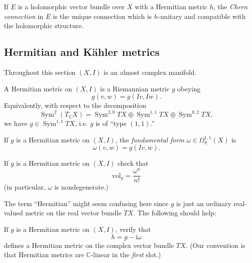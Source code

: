 \documentclass[12pt,letterpaper,reqno]{amsart}
\numberwithin{equation}{section}
\newcommand{\R}{\ensuremath{\mathbb R}}
\newcommand{\C}{\ensuremath{\mathbb C}}
\newcommand{\kahler}{K\"ahler\xspace}
\newcommand{\I}{{\mathrm i}}
\newcommand{\ti}[1]{\textit{#1}}
\DeclareMathOperator{\Sym}{Sym}
\begin{document}
\begin{defn}
If $E$ is a holomorphic vector bundle over $X$ with
a Hermitian metric $h$, the \ti{Chern connection} 
in $E$ is the unique connection which is 
$h$-unitary and compatible with the holomorphic
structure.
\end{defn}

\subsection{Hermitian and \kahler metrics}
Throughout this section $(X,I)$ is an almost complex manifold.

\begin{defn} A Hermitian metric on 
$(X,I)$ is a Riemannian metric $g$ obeying
$$ g(v,w) = g(Iv,Iw). $$
Equivalently, with respect to the decomposition 
\begin{equation}
  \Sym^2 (T_\C X) = \Sym^{2,0} TX \oplus \Sym^{1,1} TX \oplus \Sym^{0,2} TX,
\end{equation}
we have $g \in \Sym^{1,1} TX$, i.e. $g$ is of ``type $(1,1)$.''
\end{defn}

\begin{defn} If $g$ is a Hermitian metric on $(X,I)$, 
the \ti{fundamental form} $\omega \in \Omega^{1,1}_\R(X)$
is
\begin{equation}
  \omega(v,w) = g(Iv,w).
\end{equation}
\end{defn}

\begin{exercise}If $g$ is a Hermitian metric on $(X,I)$ check that
\begin{equation}
  {\mathrm {vol}}_g = \frac{\omega^n}{n!}
\end{equation}
(in particular, $\omega$ is nondegenerate.)
\end{exercise}

The term ``Hermitian'' might seem confusing here since $g$ is just 
an ordinary real-valued metric on the real vector bundle 
$TX$. The following should help:

\begin{exercise} \label{exc:hermitian-metric} 
If $g$ is a Hermitian metric on $(X,I)$,
verify that
\begin{equation}
  h = g - \I \omega
\end{equation}
defines a Hermitian metric
on the complex vector bundle $TX$.
(Our convention is that Hermitian metrics are
$\C$-linear in the \ti{first} slot.)
\end{exercise}
\end{document}
